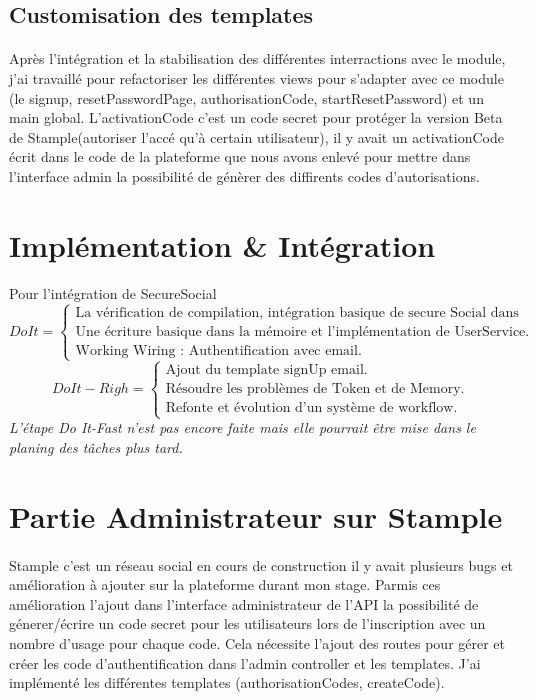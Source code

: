 \subsection{Customisation des templates}
\paragraph{}
Après l'intégration et la stabilisation des différentes interractions avec le module, j'ai travaillé pour refactoriser les différentes views pour s'adapter avec ce module (le signup, resetPasswordPage, authorisationCode, startResetPassword) et un main global.
L'activationCode c'est un code secret pour protéger la version Beta de Stample(autoriser l'accé qu'à certain utilisateur), il y avait un activationCode écrit dans le code de la plateforme que nous avons enlevé pour mettre dans l'interface admin la possibilité de génèrer des diffirents codes d'autorisations.
\section{Implémentation \& Intégration}
Pour l'intégration de SecureSocial 
\[
Do It =
\begin{cases}
\text{La vérification de compilation, intégration basique de secure Social dans Stample.}\\
\text{Une écriture basique dans la mémoire et l'implémentation de UserService.}\\
\text{Working Wiring : Authentification avec email.}
\end{cases}
\]
\[
Do It-Righ =
\begin{cases}
\text{Ajout du template signUp email.}\\
\text{Résoudre les problèmes de Token et de Memory.}\\
\text{Refonte et évolution d'un système de workflow.}
\end{cases}
\]
\textit{L'étape Do It-Fast n'est pas encore faite mais elle pourrait être mise dans le planing des tâches plus tard. }
\section{Partie Administrateur sur Stample}
\paragraph{}
Stample c'est un réseau social en cours de construction il y avait plusieurs bugs et amélioration à ajouter sur la plateforme durant mon stage.
Parmis ces amélioration l'ajout dans l'interface administrateur de l'API la possibilité de génerer/écrire un code
secret pour les utilisateurs lors de l'inscription avec un nombre d'usage pour chaque code.
Cela nécessite l'ajout des routes pour gérer et créer les code d'authentification dans l'admin 
controller et les templates.
J'ai implémenté les différentes templates (authorisationCodes, createCode).

